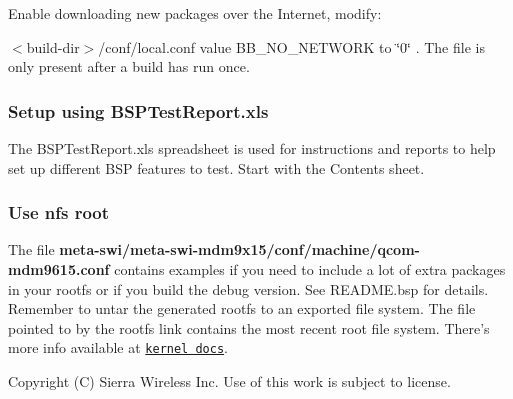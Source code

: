 Enable downloading new packages over the Internet, modify\+:

{\ttfamily $<$build-\/dir$>$/conf/local}.conf value {\ttfamily B\+B\+\_\+\+N\+O\+\_\+\+N\+E\+T\+W\+O\+R\+K} to \char`\"{}0\char`\"{} . The file is only present after a build has run once.\hypertarget{yocto_install_notes_yoctoBSPTestReport}{}\subsubsection{Setup using B\+S\+P\+Test\+Report.\+xls}\label{yocto_install_notes_yoctoBSPTestReport}
The {\ttfamily B\+S\+P\+Test\+Report.\+xls} spreadsheet is used for instructions and reports to help set up different B\+S\+P features to test. Start with the Contents sheet.\hypertarget{yocto_install_notes_getstartedInstallNotes_yoctoNFSRoot}{}\subsubsection{Use nfs root}\label{yocto_install_notes_getstartedInstallNotes_yoctoNFSRoot}
The file {\bfseries meta-\/swi/meta-\/swi-\/mdm9x15/conf/machine/qcom-\/mdm9615.\+conf} contains examples if you need to include a lot of extra packages in your rootfs or if you build the debug version. See R\+E\+A\+D\+M\+E.\+bsp for details. Remember to untar the generated rootfs to an exported file system. The file pointed to by the rootfs link contains the most recent root file system. There’s more info available at \href{https://www.kernel.org/doc/Documentation/filesystems/nfs/nfsroot.txt}{\tt kernel docs}. 



Copyright (C) Sierra Wireless Inc. Use of this work is subject to license. 
